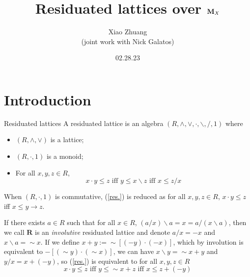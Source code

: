 \documentclass[professionalfont, handout, 10pt]{beamer} %
\title[Residuated lattices over $\m M_X$]{Residuated lattices over $\m M_X$}
\author[Xiao Zhuang]{Xiao Zhuang\\
  \small{(joint work with Nick Galatos)} }
\institute[University of Denver]
{University of Denver}
\date{02.28.23}
\theoremstyle{plain}
\theoremstyle{definition}
\newcommand{\m}[1]{{\mathbf {#1} }}
\begin{document}


\begin{frame}[plain]{}
\hsize\textwidth
\columnwidth\textwidth
\maketitle

\end{frame}

\section{Introduction}

\begin{frame}{Residuated lattices}
    A residuated lattice is an algebra $(R, \wedge, \vee, \cdot, \backslash, /, 1)$ where
    \begin{itemize}
        \item $(R, \wedge, \vee)$ is a lattice;

        \item $(R, \cdot, 1)$ is a monoid;

        \item For all $x, y, z \in R$,
        \begin{equation}\tag{residuation}\label{res.}
            x \cdot y \leq z \text{ iff } y \leq x \backslash z \text{ iff } x \leq z/x
        \end{equation}
    \end{itemize}

\pause

{ When $(R, \cdot, 1)$ is commutative, (\ref{res.}) is reduced as for all $x, y, z \in R$, $x \cdot y \leq z$ iff $x \leq y \rightarrow z$. \pause

If there exists $a \in R$ such that for all $x \in R$, $(a/x) \backslash a = x = a/(x \backslash a)$, then we call $\m R$ is an \emph{involutive} residuated lattice and denote $a/x = -x$ and $x \backslash a = {\sim} x$.
If we define $x+y := {\sim}[(-y) \cdot (-x)]$, which by involution is equivalent to $-[({\sim}y) \cdot ({\sim}x)]$, we can have $x \backslash y = {\sim}x + y$ and $y/x = x + (-y)$, so (\ref{res.}) is equivalent to for all $x, y, z \in R$
$$x \cdot y \leq z \text{ iff } y \leq {\sim} x + z \text{ iff } x \leq z + (-y)$$}

\end{frame}
\end{document}
